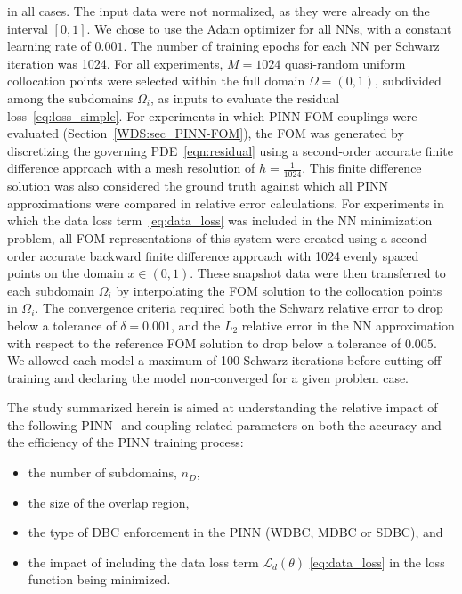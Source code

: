 \documentclass[oneside,final]{csri23}
\begin{document}
in all cases. The input data were not normalized, as they were already on the interval $[0,1]$. We chose to use the Adam optimizer for all NNs, with a constant learning rate of $0.001$. The number of training epochs for each NN per Schwarz iteration was 1024. For all experiments, $M=1024$ quasi-random uniform collocation points were selected within the full domain $\Omega = (0,1)$, subdivided among the subdomains $\Omega_i$, as inputs to evaluate the residual loss~\eqref{eq:loss_simple}.  For experiments in which PINN-FOM couplings were evaluated (Section~\ref{WDS:sec_PINN-FOM}), the FOM was generated by discretizing the governing PDE~\eqref{eqn:residual} using a second-order accurate finite difference approach with a mesh resolution of $h = \frac{1}{1024}$. This finite difference solution was also considered the ground truth against which all PINN approximations were compared in relative error calculations. For experiments in which the data loss term~\eqref{eq:data_loss} was included in the NN minimization problem, all FOM representations of this system were created using a second-order accurate backward finite difference approach with 1024 evenly spaced points on the domain $x\in(0,1)$. These snapshot data were then transferred to each subdomain $\Omega_i$ by interpolating the FOM solution to the collocation points in $\Omega_i$. The convergence criteria required both the Schwarz relative error to drop below a tolerance of $\delta = 0.001$, and the $L_2$ relative error in the NN approximation with respect to the reference FOM solution to drop below a tolerance of $0.005$. We allowed each model a maximum of 100 Schwarz iterations before cutting off training and declaring the model non-converged for a given problem case. 

The study summarized herein is aimed at understanding the relative impact of the following PINN- and coupling-related parameters on both the accuracy and the efficiency of the PINN training process: 
\begin{itemize}
    \item the number of subdomains, $n_D$,
    \item the size of the overlap region,
    \item the type of DBC enforcement in the PINN (WDBC, MDBC or SDBC), and 
    \item the impact of including the data loss term $\mathcal{L}_d(\theta)$ \eqref{eq:data_loss} in the loss function being minimized.  
\end{itemize}
\end{document}
